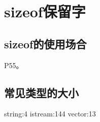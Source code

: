 \section{sizeof保留字}

\subsection{sizeof的使用场合}
\cite{pibible}P55。

\subsection{常见类型的大小}
string:4
istream:144
vector:13


